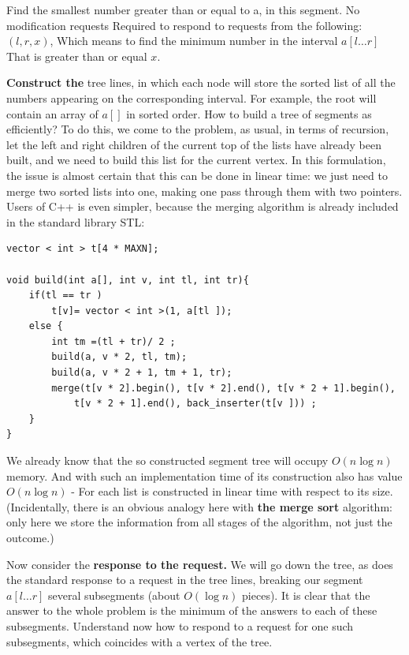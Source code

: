 Find the smallest number greater than or equal to a, in this segment. No modification requests
Required to respond to requests from the following: $(l, r, x)$, Which means to find the minimum number in the interval $a [l \ldots r]$ That is greater than or equal $x$.

\textbf{Construct the} tree lines, in which each node will store the sorted list of all the numbers appearing on the corresponding interval. For example, the root will contain an array of $a []$ in sorted order. How to build a tree of segments as efficiently? To do this, we come to the problem, as usual, in terms of recursion, let the left and right children of the current top of the lists have already been built, and we need to build this list for the current vertex. In this formulation, the issue is almost certain that this can be done in linear time: we just need to merge two sorted lists into one, making one pass through them with two pointers. Users of C++ is even simpler, because the merging algorithm is already included in the standard library STL:

\begin{verbatim}
vector < int > t[4 * MAXN];
 
void build(int a[], int v, int tl, int tr){
    if(tl == tr )
        t[v]= vector < int >(1, a[tl ]);
    else {
        int tm =(tl + tr)/ 2 ;
        build(a, v * 2, tl, tm);
        build(a, v * 2 + 1, tm + 1, tr);
        merge(t[v * 2].begin(), t[v * 2].end(), t[v * 2 + 1].begin(),
            t[v * 2 + 1].end(), back_inserter(t[v ])) ;
    }
} 
\end{verbatim}
We already know that the so constructed segment tree will occupy $O (n \log n)$ memory. And with such an implementation time of its construction also has value $O (n \log n)$ - For each list is constructed in linear time with respect to its size. (Incidentally, there is an obvious analogy here with \textbf{the merge sort} algorithm: only here we store the information from all stages of the algorithm, not just the outcome.)

Now consider the \textbf{response to the request.} We will go down the tree, as does the standard response to a request in the tree lines, breaking our segment $a [l \ldots r]$ several subsegments (about $O (\log n)$ pieces). It is clear that the answer to the whole problem is the minimum of the answers to each of these subsegments. Understand now how to respond to a request for one such subsegments, which coincides with a vertex of the tree.


